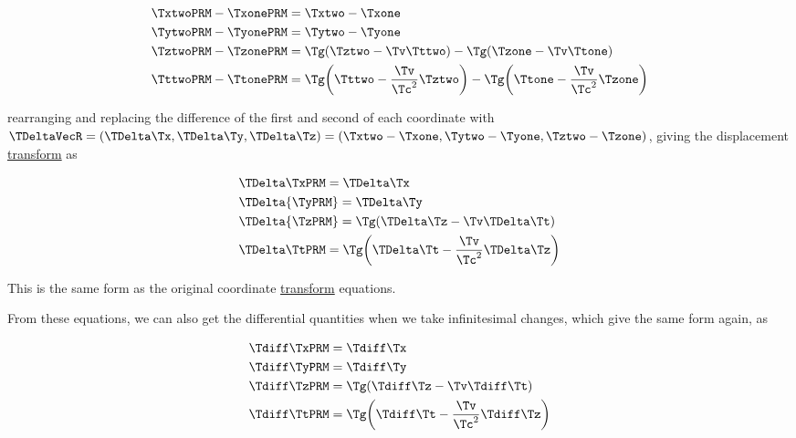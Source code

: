 \begin{equation}
	\begin{aligned}
		 & \TxtwoPRM -\TxonePRM  = \Txtwo -\Txone                                                                                          \\
		 & \TytwoPRM -\TyonePRM  = \Tytwo -\Tyone                                                                                          \\
		 & \TztwoPRM -\TzonePRM  = \Tg  ( \Tztwo - \Tv  \Tttwo )-{\Tg } ( \Tzone - \Tv  \Ttone )                                               \\
		 & \TttwoPRM -\TtonePRM  = \Tg  \bigg( \Tttwo -\frac{\Tv }{ \Tc ^2} \Tztwo  \bigg)-{\Tg } \bigg( \Ttone -\frac{\Tv }{\Tc ^2} \Tzone  \bigg)
	\end{aligned}
\end{equation}

rearranging and replacing the difference of the first and second of each coordinate with ${\TDeltaVecR  } = ({\TDelta }\Tx ,{\TDelta }\Ty ,{\TDelta }\Tz ) = (\Txtwo -\Txone ,\Tytwo -\Tyone ,\Tztwo -\Tzone )$, giving the displacement \hyperlink{def-transform}{transform} as

\begin{equation}
	\label{eq: interval of Coordinates}
	\begin{aligned}
		 & \TDelta  \TxPRM  = {\TDelta  \Tx }                                                   \\
		 & \TDelta  {\TyPRM  } = {\TDelta  \Ty }                                                 \\
		 & \TDelta  {\TzPRM  } = \Tg  ( {\TDelta  \Tz }- \Tv  \TDelta  \Tt )                       \\
		 & {\TDelta  \TtPRM  } = \Tg  \bigg( \TDelta  \Tt -\frac{\Tv }{ \Tc ^2} {\TDelta  \Tz } \bigg)
	\end{aligned}
\end{equation}

This is the same form as the original coordinate \hyperlink{def-transform}{transform} equations.

From these equations, we can also get the differential quantities when we take infinitesimal changes, which give the same form again, as

\begin{equation}
	\label{eq: infinitesimal interval of Coordinates}
	\begin{aligned}
		 & {\Tdiff \TxPRM  } = {\Tdiff \Tx }                                        \\
		 & {\Tdiff \TyPRM  } = {\Tdiff \Ty }                                        \\
		 & {\Tdiff \TzPRM  } = \Tg  (\Tdiff \Tz - {\Tv }\Tdiff \Tt )                        \\
		 & {\Tdiff \TtPRM  } = \Tg  \bigg(\Tdiff \Tt -\frac{\Tv }{ \Tc ^2} \Tdiff \Tz  \bigg)
	\end{aligned}
\end{equation}

